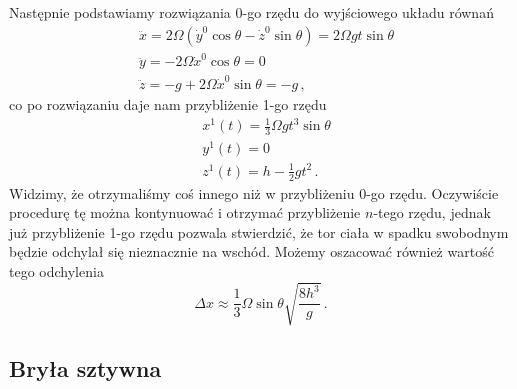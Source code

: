 \documentclass[../main.tex]{subfiles}
\begin{document}
Następnie podstawiamy rozwiązania 0-go rzędu do wyjściowego układu równań
\begin{equation*}
    \begin{split}
        &\ddot{x}=2\Omega (\dot{y}^0\cos\theta-\dot{z}^0\sin\theta)=2\Omega gt\sin\theta\\
        &\ddot y=-2\Omega \dot{x}^0\cos\theta=0\\
        &\ddot z=-g+2\Omega \dot{x}^0\sin\theta=-g\,,
    \end{split}
\end{equation*}
co po rozwiązaniu daje nam przybliżenie 1-go rzędu
\begin{equation*}
    \begin{split}
        &x^1(t)=\frac{1}{3}\Omega gt^3\sin\theta\\
        &y^1(t)=0\\
        &z^1(t)=h-\frac{1}{2}gt^2\,.
    \end{split}
\end{equation*}
Widzimy, że otrzymaliśmy coś innego niż w przybliżeniu 0-go rzędu. Oczywiście procedurę tę można
kontynuować i otrzymać przybliżenie \(n\)-tego rzędu, jednak już przybliżenie 1-go rzędu pozwala
stwierdzić, że tor ciała w spadku swobodnym będzie odchylał się nieznacznie na wschód. Możemy
oszacować również wartość tego odchylenia
\begin{equation*}
    \Delta x\approx\frac{1}{3}\Omega \sin\theta \sqrt{\frac{8h^3}{g}}\,.
\end{equation*}

\subsection{Bryła sztywna}
\end{document}
